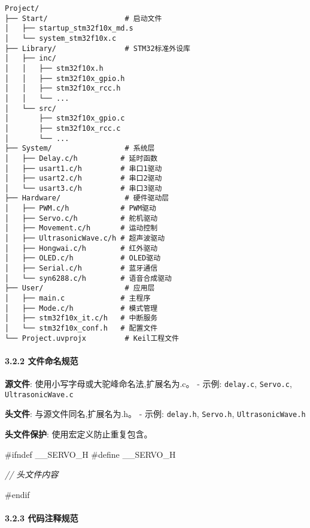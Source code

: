 \documentclass[
]{article}
\newenvironment{Shaded}{}{}
\newcommand{\CommentTok}[1]{\textcolor[rgb]{0.38,0.63,0.69}{\textit{#1}}}
\newcommand{\PreprocessorTok}[1]{\textcolor[rgb]{0.74,0.48,0.00}{#1}}
\begin{document}
\begin{verbatim}
Project/
├── Start/                  # 启动文件
│   ├── startup_stm32f10x_md.s
│   └── system_stm32f10x.c
├── Library/                # STM32标准外设库
│   ├── inc/
│   │   ├── stm32f10x.h
│   │   ├── stm32f10x_gpio.h
│   │   ├── stm32f10x_rcc.h
│   │   └── ...
│   └── src/
│       ├── stm32f10x_gpio.c
│       ├── stm32f10x_rcc.c
│       └── ...
├── System/                 # 系统层
│   ├── Delay.c/h          # 延时函数
│   ├── usart1.c/h         # 串口1驱动
│   ├── usart2.c/h         # 串口2驱动
│   └── usart3.c/h         # 串口3驱动
├── Hardware/               # 硬件驱动层
│   ├── PWM.c/h            # PWM驱动
│   ├── Servo.c/h          # 舵机驱动
│   ├── Movement.c/h       # 运动控制
│   ├── UltrasonicWave.c/h # 超声波驱动
│   ├── Hongwai.c/h        # 红外驱动
│   ├── OLED.c/h           # OLED驱动
│   ├── Serial.c/h         # 蓝牙通信
│   └── syn6288.c/h        # 语音合成驱动
├── User/                   # 应用层
│   ├── main.c             # 主程序
│   ├── Mode.c/h           # 模式管理
│   ├── stm32f10x_it.c/h   # 中断服务
│   └── stm32f10x_conf.h   # 配置文件
└── Project.uvprojx         # Keil工程文件
\end{verbatim}

\hypertarget{ux6587ux4ef6ux547dux540dux89c4ux8303}{%
\paragraph{3.2.2
文件命名规范}\label{ux6587ux4ef6ux547dux540dux89c4ux8303}}

\textbf{源文件}: 使用小写字母或大驼峰命名法,扩展名为.c。 - 示例:
\texttt{delay.c}, \texttt{Servo.c}, \texttt{UltrasonicWave.c}

\textbf{头文件}: 与源文件同名,扩展名为.h。 - 示例: \texttt{delay.h},
\texttt{Servo.h}, \texttt{UltrasonicWave.h}

\textbf{头文件保护}: 使用宏定义防止重复包含。

\begin{Shaded}
\begin{Highlighting}[]
\PreprocessorTok{\#ifndef \_\_SERVO\_H}
\PreprocessorTok{\#define \_\_SERVO\_H}

\CommentTok{// 头文件内容}

\PreprocessorTok{\#endif}
\end{Highlighting}
\end{Shaded}

\hypertarget{ux4ee3ux7801ux6ce8ux91caux89c4ux8303}{%
\paragraph{3.2.3
代码注释规范}\label{ux4ee3ux7801ux6ce8ux91caux89c4ux8303}}
\end{document}
